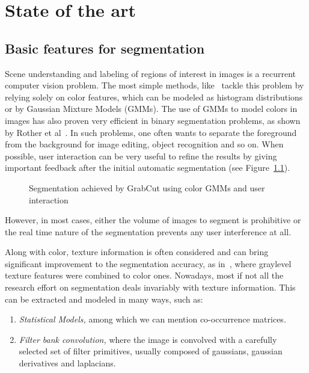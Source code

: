 \chapter{State of the art} \label{chap:state_of_the_art}

\section{Basic features for segmentation} \label{sect:basic_features}
Scene understanding and labeling of regions of interest in images is a recurrent computer vision problem. The most simple methods, like~\cite{saber:color} tackle this problem by relying solely on color features, which can be modeled as histogram distributions or by Gaussian Mixture Models (GMMs). The use of GMMs to model colors in images has also proven very efficient in binary segmentation problems, as shown by Rother et al~\cite{rother:grab_cut}. In such problems, one often wants to separate the foreground from the background for image editing, object recognition and so on. When possible, user interaction can be very useful to refine the results by giving important feedback after the initial automatic segmentation (see Figure~\ref{fig:grab_cut}).

\begin{figure}[htb]
        \centering
        \epsfxsize=4cm
        {}
\caption{Segmentation achieved by GrabCut using color GMMs and user interaction}
\label{fig:grab_cut}
\end{figure}

However, in most cases, either the volume of images to segment is prohibitive or the real time nature of the segmentation prevents any user interference at all.

Along with color, texture information is often considered and can bring significant improvement to the segmentation accuracy, as in~\cite{feng:color_tex}, where graylevel texture features were combined to color ones. Nowadays, most if not all the research effort on segmentation deals invariably with texture information. This can be extracted and modeled in many ways, such as:

\begin{enumerate}
\item \emph{Statistical Models,} among which we can mention co-occurrence matrices.

\item \emph{Filter bank convolution,} where the image is convolved with a carefully selected set of filter primitives, usually composed of gaussians, gaussian derivatives and laplacians.
\end{enumerate}

